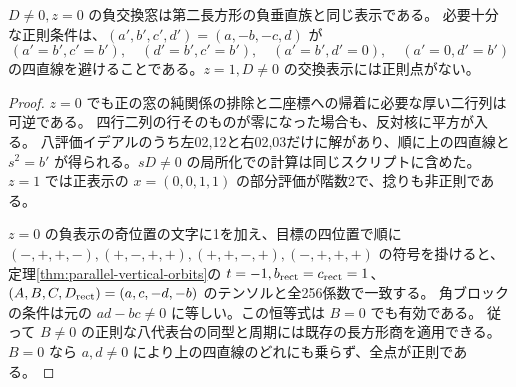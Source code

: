 \begin{proposition}\label{prop:zero-exchange-vertical-identification}
$D\ne0,z=0$ の負交換窓は第二長方形の負垂直族と同じ表示である。
必要十分な正則条件は、$(a',b',c',d')=(a,-b,-c,d)$ が
\[
 (a'=b',c'=b'),\quad(d'=b',c'=b'),\quad
 (a'=b',d'=0),\quad(a'=0,d'=b')
\]
の四直線を避けることである。$z=1,D\ne0$ の交換表示には正則点がない。
\end{proposition}
\begin{proof}
$z=0$ でも正の窓の純関係の排除と二座標への帰着に必要な厚い二行列は可逆である。
四行二列の行そのものが零になった場合も、反対核に平方が入る。
八評価イデアルのうち左02,12と右02,03だけに解があり、順に上の四直線と
$s^2=b'$ が得られる。$sD\ne0$ の局所化での計算は同じスクリプトに含めた。
$z=1$ では正表示の $x=(0,0,1,1)$ の部分評価が階数2で、捻りも非正則である。

$z=0$ の負表示の奇位置の文字に1を加え、目標の四位置で順に
$(-,+,+,-),(+,-,+,+),(+,+,-,+),(-,+,+,+)$ の符号を掛けると、
定理\ref{thm:parallel-vertical-orbits}の $t=-1,b_{\rm rect}=c_{\rm rect}=1$、
$(A,B,C,D_{\rm rect})=(a,c,-d,-b)$ のテンソルと全256係数で一致する。
角ブロックの条件は元の $ad-bc\ne0$ に等しい。この恒等式は $B=0$ でも有効である。
従って $B\ne0$ の正則な八代表台の同型と周期には既存の長方形商を適用できる。
$B=0$ なら $a,d\ne0$ により上の四直線のどれにも乗らず、全点が正則である。
\end{proof}
